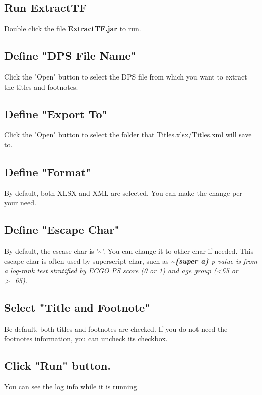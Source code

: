 \documentclass[11pt]{article}
\begin{document}
\subsection{Run ExtractTF}
\label{sec:orgff9b9c5}
Double click the file \textbf{ExtractTF.jar} to run. 

\subsection{Define "DPS File Name"}
\label{sec:orgdcf1ca0}
Click the "Open" button to select the DPS file from which you want to extract the titles and footnotes.

\subsection{Define "Export To"}
\label{sec:org4f6ab70}
Click the "Open" button to select the folder that Titles.xlsx/Titles.xml will save to. 

\subsection{Define "Format"}
\label{sec:org22c047e}
By default, both XLSX and XML are selected. You can make the change per your need.

\subsection{Define "Escape Char"}
\label{sec:org9784bb0}
By default, the escase char is '\textasciitilde{}'. You can change it to other char if needed.
This escape char is often used by superscript char, such as \emph{\textbf{\textasciitilde{}\{super a\}} p-value is from a log-rank test stratified by ECGO PS score (0 or 1) and age group (<65 or >=65).}

\subsection{Select "Title and Footnote"}
\label{sec:orgccf5a10}
Be default, both titles and footnotes are checked. If you do not need the footnotes information, you can uncheck its checkbox.

\subsection{Click "Run" button.}
\label{sec:orgd845906}
You can see the log info while it is running. 
\end{document}
